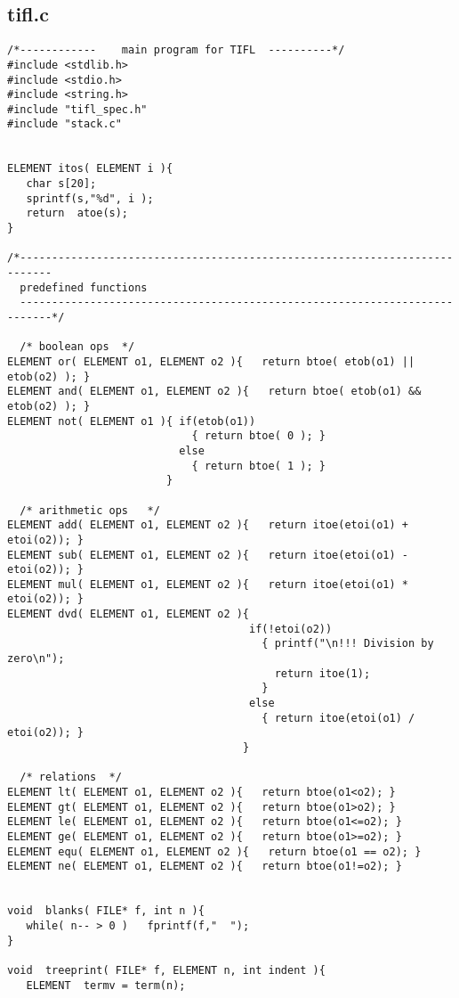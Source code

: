 \subsection{tifl.c}
\begin{verbatim}
/*------------    main program for TIFL  ----------*/
#include <stdlib.h>
#include <stdio.h>
#include <string.h>
#include "tifl_spec.h"
#include "stack.c"


ELEMENT itos( ELEMENT i ){
   char s[20];
   sprintf(s,"%d", i );
   return  atoe(s);
}

/*---------------------------------------------------------------------------
  predefined functions
  ---------------------------------------------------------------------------*/

  /* boolean ops  */
ELEMENT or( ELEMENT o1, ELEMENT o2 ){   return btoe( etob(o1) || etob(o2) ); } 
ELEMENT and( ELEMENT o1, ELEMENT o2 ){   return btoe( etob(o1) && etob(o2) ); }
ELEMENT not( ELEMENT o1 ){ if(etob(o1))
                             { return btoe( 0 ); }
                           else 
                             { return btoe( 1 ); }
                         }

  /* arithmetic ops   */
ELEMENT add( ELEMENT o1, ELEMENT o2 ){   return itoe(etoi(o1) + etoi(o2)); }
ELEMENT sub( ELEMENT o1, ELEMENT o2 ){   return itoe(etoi(o1) - etoi(o2)); }
ELEMENT mul( ELEMENT o1, ELEMENT o2 ){   return itoe(etoi(o1) * etoi(o2)); }
ELEMENT dvd( ELEMENT o1, ELEMENT o2 ){   
                                      if(!etoi(o2))
                                        { printf("\n!!! Division by zero\n");
                                          return itoe(1);
                                        }
                                      else
                                        { return itoe(etoi(o1) / etoi(o2)); }
                                     }

  /* relations  */
ELEMENT lt( ELEMENT o1, ELEMENT o2 ){   return btoe(o1<o2); }
ELEMENT gt( ELEMENT o1, ELEMENT o2 ){   return btoe(o1>o2); }
ELEMENT le( ELEMENT o1, ELEMENT o2 ){   return btoe(o1<=o2); }
ELEMENT ge( ELEMENT o1, ELEMENT o2 ){   return btoe(o1>=o2); }
ELEMENT equ( ELEMENT o1, ELEMENT o2 ){   return btoe(o1 == o2); }
ELEMENT ne( ELEMENT o1, ELEMENT o2 ){   return btoe(o1!=o2); }


void  blanks( FILE* f, int n ){
   while( n-- > 0 )   fprintf(f,"  ");
}

void  treeprint( FILE* f, ELEMENT n, int indent ){
   ELEMENT  termv = term(n);


\end{verbatim}
